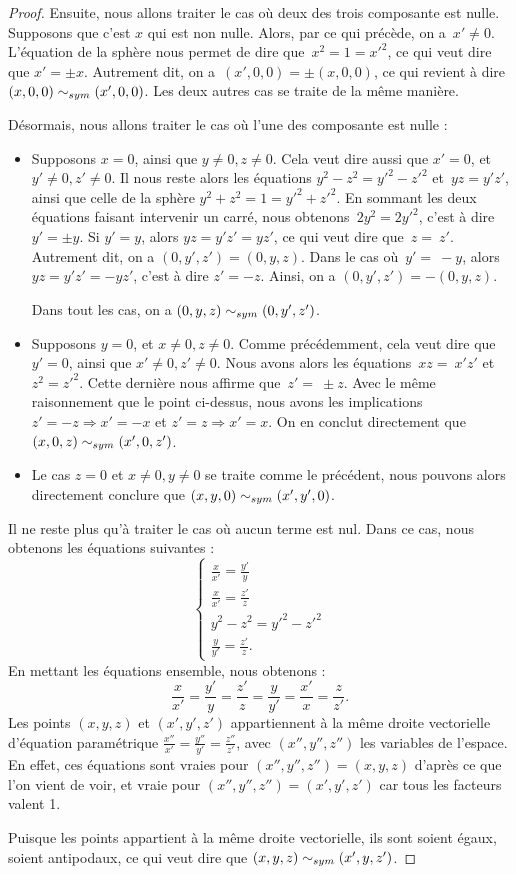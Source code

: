 \documentclass[hidelinks, 10pt]{article}
\begin{document}
\begin{proof}
Ensuite, nous allons traiter le cas où deux des trois composante est nulle. Supposons que c'est $x$ qui est non nulle. Alors, par ce qui précède, on a~$x'\neq0$. L'équation de la sphère nous permet de dire que~$x^2=1=x'^2$, ce qui veut dire que $x'=\pm x$. Autrement dit, on a~$(x',0,0)=\pm(x,0,0)$, ce qui revient à dire $(x,0,0)\sim_{sym}(x',0,0)$. Les deux autres cas se traite de la même manière.

\bigskip Désormais, nous allons traiter le cas où l'une des composante est nulle : \begin{itemize}
    \item Supposons $x=0$, ainsi que $y\neq0, z\neq0$. Cela veut dire aussi que $x'=0$, et $y'\neq0,z'\neq0$. Il nous reste alors les équations $y^2-z^2=y'^2-z'^2$ et~$yz=y'z'$, ainsi que celle de la sphère $y^2+z^2=1=y'^2+z'^2$. En sommant les deux équations faisant intervenir un carré, nous obtenons~$2y^2=2y'^2$, c'est à dire $y'=\pm y$. Si $y'=y$, alors $yz=y'z'=yz'$, ce qui veut dire que~$z=~z'$. Autrement dit, on a $(0,y',z')=(0,y,z)$. Dans le cas où~$y'=~-y$, alors~$yz=y'z'=-yz'$, c'est à dire $z'=-z$. Ainsi, on a $(0,y',z')=-(0,y,z)$.

    Dans tout les cas, on a $(0,y,z)\sim_{sym}(0,y',z')$.
    \item Supposons $y=0$, et $x\neq0,z\neq0$. Comme précédemment, cela veut dire que $y'=0$, ainsi que $x'\neq0,z'\neq0$. Nous avons alors les équations~$xz=~x'z'$ et $z^2=z'^2$. Cette dernière nous affirme que~$z'=~\pm z$. Avec le même raisonnement que le point ci-dessus, nous avons les implications $z'=-z\Rightarrow x'=-x$ et $z'=z\Rightarrow x'=x$. On en conclut directement que $(x,0,z)\sim_{sym}(x',0,z')$.
    \item Le cas $z=0$ et $x\neq0,y\neq0$ se traite comme le précédent, nous pouvons alors directement conclure que $(x,y,0)\sim_{sym}(x',y',0)$.
\end{itemize}

Il ne reste plus qu'à traiter le cas où aucun terme est nul. Dans ce cas, nous obtenons les équations suivantes : \[\left\{\begin{matrix}
\frac{x}{x'}=\frac{y'}{y}\\ 
\frac{x}{x'}=\frac{z'}{z}\\ 
y^2-z^2=y'^2-z'^2\\ 
\frac{y}{y'}=\frac{z'}{z}.\end{matrix}\right.\]En mettant les équations ensemble, nous obtenons : \[\frac{x}{x'}=\frac{y'}{y}=\frac{z'}{z}=\frac{y}{y'}=\frac{x'}{x}=\frac{z}{z'}.\]Les points $(x,y,z)$ et $(x',y',z')$ appartiennent à la même droite vectorielle d'équation paramétrique $\frac{x''}{x'}=\frac{y''}{y'}=\frac{z''}{z'}$, avec $(x'',y'',z'')$ les variables de l'espace. En effet, ces équations sont vraies pour $(x'',y'',z'')=(x,y,z)$ d'après ce que l'on vient de voir, et vraie pour $(x'',y'',z'')=(x',y',z')$ car tous les facteurs valent 1.

Puisque les points appartient à la même droite vectorielle, ils sont soient égaux, soient antipodaux, ce qui veut dire que $(x,y,z)\sim_{sym}(x',y,z')$.
\end{proof}
\end{document}
